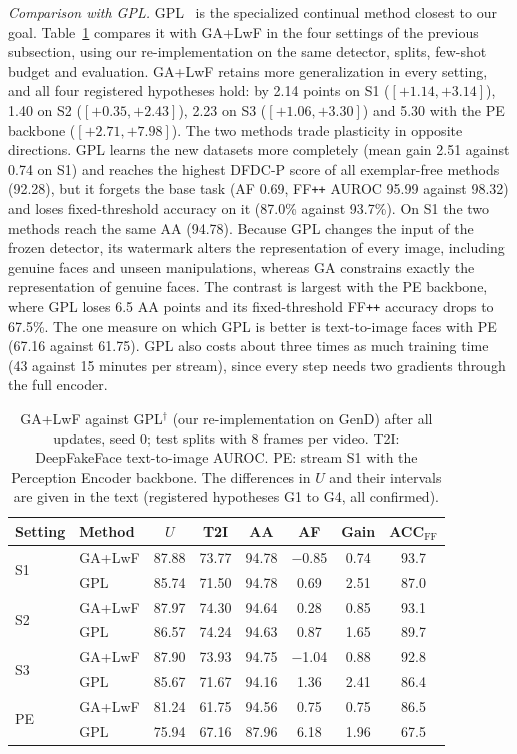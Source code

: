 \documentclass[journal]{IEEEtran}
\newcommand{\ffpp}{FF\texttt{++}}
\begin{document}
\textit{Comparison with GPL.}\label{sec:gpl} GPL~\cite{zhang2025gpl} is the specialized continual method closest to our goal. Table~\ref{tab:gpl} compares it with GA+LwF in the four settings of the previous subsection, using our re-implementation on the same detector, splits, few-shot budget and evaluation. GA+LwF retains more generalization in every setting, and all four registered hypotheses hold: by 2.14 points on S1 ($[+1.14,+3.14]$), 1.40 on S2 ($[+0.35,+2.43]$), 2.23 on S3 ($[+1.06,+3.30]$) and 5.30 with the PE backbone ($[+2.71,+7.98]$). The two methods trade plasticity in opposite directions. GPL learns the new datasets more completely (mean gain 2.51 against 0.74 on S1) and reaches the highest DFDC-P score of all exemplar-free methods (92.28), but it forgets the base task (AF 0.69, \ffpp{} AUROC 95.99 against 98.32) and loses fixed-threshold accuracy on it (87.0\% against 93.7\%). On S1 the two methods reach the same AA (94.78). Because GPL changes the input of the frozen detector, its watermark alters the representation of every image, including genuine faces and unseen manipulations, whereas GA constrains exactly the representation of genuine faces. The contrast is largest with the PE backbone, where GPL loses 6.5 AA points and its fixed-threshold \ffpp{} accuracy drops to 67.5\%. The one measure on which GPL is better is text-to-image faces with PE (67.16 against 61.75). GPL also costs about three times as much training time (43 against 15 minutes per stream), since every step needs two gradients through the full encoder.

\begin{table}[t]
\caption{GA+LwF against GPL$^\dagger$ (our re-implementation on GenD) after all updates, seed 0; test splits with 8 frames per video. T2I: DeepFakeFace text-to-image AUROC. PE: stream S1 with the Perception Encoder backbone. The differences in $U$ and their intervals are given in the text (registered hypotheses G1 to G4, all confirmed).}
\label{tab:gpl}
\centering
\footnotesize
\setlength{\tabcolsep}{3pt}
\begin{tabular}{@{}llcccccc@{}}
\toprule
Setting & Method & $U$ & T2I & AA & AF & Gain & ACC$_{\mathrm{FF}}$ \\
\midrule
\multirow{2}{*}{S1} & GA+LwF & 87.88 & 73.77 & 94.78 & $-$0.85 & 0.74 & 93.7 \\
 & GPL & 85.74 & 71.50 & 94.78 & 0.69 & 2.51 & 87.0 \\
\midrule
\multirow{2}{*}{S2} & GA+LwF & 87.97 & 74.30 & 94.64 & 0.28 & 0.85 & 93.1 \\
 & GPL & 86.57 & 74.24 & 94.63 & 0.87 & 1.65 & 89.7 \\
\midrule
\multirow{2}{*}{S3} & GA+LwF & 87.90 & 73.93 & 94.75 & $-$1.04 & 0.88 & 92.8 \\
 & GPL & 85.67 & 71.67 & 94.16 & 1.36 & 2.41 & 86.4 \\
\midrule
\multirow{2}{*}{PE} & GA+LwF & 81.24 & 61.75 & 94.56 & 0.75 & 0.75 & 86.5 \\
 & GPL & 75.94 & 67.16 & 87.96 & 6.18 & 1.96 & 67.5 \\
\bottomrule
\end{tabular}
\end{table}
\end{document}
